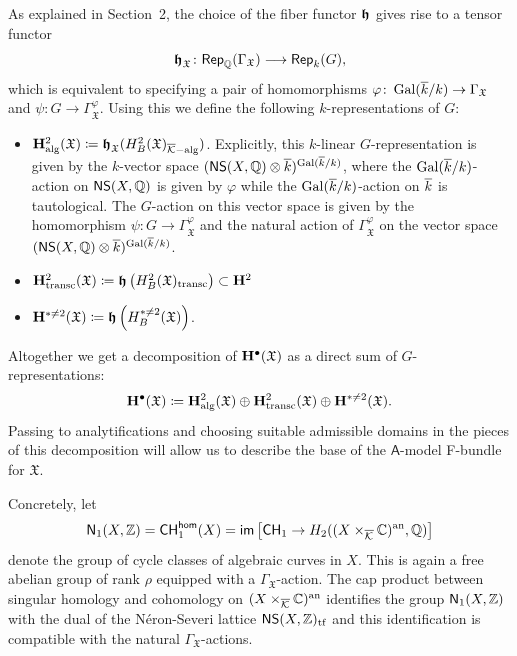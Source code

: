 \documentclass[twoside,leqno]{article}
\numberwithin{equation}{section}
\theoremstyle{plain}
\theoremstyle{definition}
\begin{document}
As explained in Section~2, the choice of the fiber functor $\boldsymbol{\mathfrak{h}}$ gives
rise to a tensor functor
\[
\boldsymbol{\mathfrak{h}}_{\mathfrak{X}} \colon \mathsf{Rep}_{\mathbb Q}(\Gamma_{\mathfrak{X}})
\longrightarrow \mathsf{Rep}_{k}(G),
\]
which is equivalent to specifying a pair of homomorphisms $\varphi \colon
\operatorname{Gal}(\overline{k}/k) \to \Gamma_{\mathfrak{X}}$ and \linebreak $\psi \colon G
\to \Gamma_{\mathfrak{X}}^{\varphi}$. 
Using this we define the following
$k$-representations of $G$:
\begin{itemize}
\item $\mathbf{H}^{2}_{\operatorname{alg}}(\mathfrak{X}) \coloneqq
  \boldsymbol{\mathfrak{h}}_{\mathfrak{X}}(H^{2}_{B}(\mathfrak{X})_{\overline{\mathcal K}-\operatorname{alg}})$.
  Explicitly, this $k$-linear
  $G$-representation is given by
  the $k$-vector space $(\mathsf{NS}(X,\mathbb Q)\otimes
  \overline{k})^{\operatorname{Gal}(\overline{k}/k)}$, where the $\operatorname{Gal}(\overline{k}/k)$-action on
  $\mathsf{NS}(X,\mathbb Q)$ is given by $\varphi$ while the
  $\operatorname{Gal}(\overline{k}/k)$-action on $\overline{k}$ is tautological. The $G$-action on
  this vector space is given by the homomorphism $\psi \colon G \to
  \Gamma_{\mathfrak{X}}^{\varphi}$ and the natural action of
  $\Gamma_{\mathfrak{X}}^{\varphi}$ on the vector space
  $(\mathsf{NS}(X,\mathbb Q)\otimes \overline{k})^{\operatorname{Gal}(\overline{k}/k)}$.
\item $\mathbf{H}^{2}_{\operatorname{transc}}(\mathfrak{X}) \coloneqq
  \boldsymbol{\mathfrak{h}}\left(H^{2}_{B}(\mathfrak{X})_{\operatorname{transc}}\right) \subset \mathbf{H}^{2}$
\item 
  $\mathbf{H}^{* \neq 2}(\mathfrak{X}) \coloneqq \boldsymbol{\mathfrak{h}}\left(H^{* \neq
  2}_{B}(\mathfrak{X})\right)$.
\end{itemize}

Altogether we get a decomposition of $\mathbf{H}^{\bullet}(\mathfrak{X})$ as a
direct sum of $G$-representations:
\begin{equation} \label{eq:WeilGdecomp}
\mathbf{H}^{\bullet}(\mathfrak{X}) \coloneqq
\mathbf{H}^{2}_{\operatorname{alg}}(\mathfrak{X})\oplus
\mathbf{H}^{2}_{\operatorname{transc}}(\mathfrak{X})\oplus \mathbf{H}^{* \neq
  2}(\mathfrak{X}).
\end{equation}
Passing to analytifications and choosing suitable admissible domains in
the pieces of this decomposition will allow us to describe the base of
the $\mathsf{A}$-model F-bundle for $\mathfrak{X}$.

\medskip

Concretely, let
\[
\mathsf{N}_{1}(X,\mathbb Z) = \mathsf{CH}^{\mathsf{hom}}_{1}(X) =
\mathsf{im} \left[ \mathsf{CH}_{1} \to
  H_{2}((X\times_{\overline{\mathcal K}} \mathbb C)^{\operatorname{an}},\mathbb Q)
  \right]
\]
denote the group of cycle classes of algebraic curves in $X$. This is
again a free abelian group of rank $\rho$ equipped with a
$\Gamma_{\mathfrak{X}}$-action.  The cap product between singular
homology and cohomology on $(X\times_{\overline{\mathcal K}}\mathbb C)^{\operatorname{an}}$ identifies the
group $\mathsf{N}_{1}(X,\mathbb Z)$ with the dual of the N\'{e}ron-Severi lattice
$\mathsf{NS}(X,\mathbb Z)_{\operatorname{tf}}$ and this identification is compatible
  with the natural $\Gamma_{\mathfrak{X}}$-actions.
\end{document}

